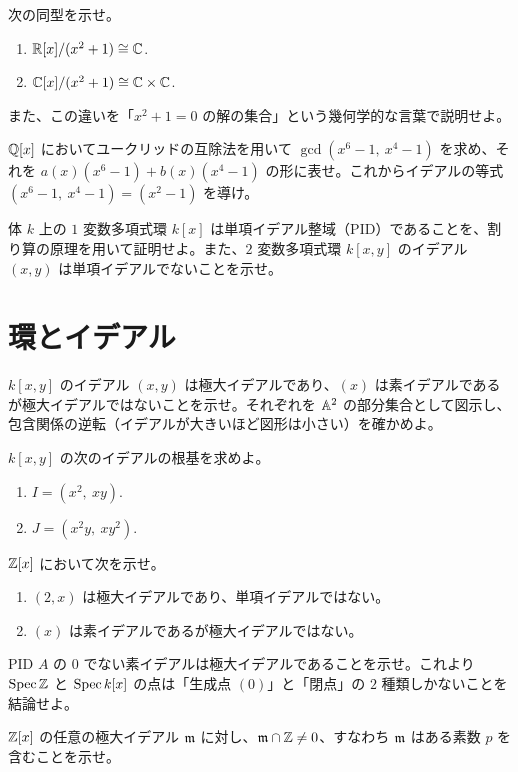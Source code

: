 次の同型を示せ。
\begin{enumerate}
  \item $\mathbb{R}[x]/(x^2+1)\cong\mathbb{C}$.
  \item $\mathbb{C}[x]/(x^2+1)\cong\mathbb{C}\times\mathbb{C}$.
\end{enumerate}
また、この違いを「$x^2+1=0$ の解の集合」という幾何学的な言葉で説明せよ。

$\mathbb{Q}[x]$ においてユークリッドの互除法を用いて $\gcd(x^6-1,\ x^4-1)$ を求め、それを $a(x)(x^6-1)+b(x)(x^4-1)$ の形に表せ。これからイデアルの等式 $(x^6-1,\ x^4-1)=(x^2-1)$ を導け。

体 $k$ 上の $1$ 変数多項式環 $k[x]$ は単項イデアル整域（PID）であることを、割り算の原理を用いて証明せよ。また、$2$ 変数多項式環 $k[x,y]$ のイデアル $(x,y)$ は単項イデアルでないことを示せ。

\section{環とイデアル}

$k[x,y]$ のイデアル $(x,y)$ は極大イデアルであり、$(x)$ は素イデアルであるが極大イデアルではないことを示せ。それぞれを $\mathbb{A}^2$ の部分集合として図示し、包含関係の逆転（イデアルが大きいほど図形は小さい）を確かめよ。

$k[x,y]$ の次のイデアルの根基を求めよ。
\begin{enumerate}
  \item $I=(x^2,\ xy)$.
  \item $J=(x^2y,\ xy^2)$.
\end{enumerate}

$\mathbb{Z}[x]$ において次を示せ。
\begin{enumerate}
  \item $(2,x)$ は極大イデアルであり、単項イデアルではない。
  \item $(x)$ は素イデアルであるが極大イデアルではない。
\end{enumerate}

PID $A$ の $0$ でない素イデアルは極大イデアルであることを示せ。これより $\operatorname{Spec}\mathbb{Z}$ と $\operatorname{Spec} k[x]$ の点は「生成点 $(0)$」と「閉点」の $2$ 種類しかないことを結論せよ。

$\mathbb{Z}[x]$ の任意の極大イデアル $\mathfrak{m}$ に対し、$\mathfrak{m}\cap\mathbb{Z}\neq 0$、すなわち $\mathfrak{m}$ はある素数 $p$ を含むことを示せ。

